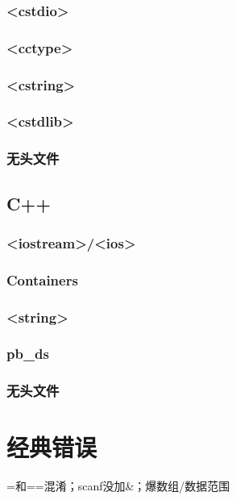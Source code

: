\documentclass[10pt]{article}
\begin{document}
\subsubsection{<cstdio>}

\subsubsection{<cctype>}

\subsubsection{<cstring>}

\subsubsection{<cstdlib>}

\subsubsection{无头文件}


\subsection{C++}
\subsubsection{<iostream>/<ios>}

\subsubsection{Containers}

\subsubsection{<string>}

%
%
%
\subsubsection{pb_ds}

\subsubsection{无头文件}

\section{经典错误}
=和==混淆；scanf没加\&；爆数组/数据范围
\end{document}
